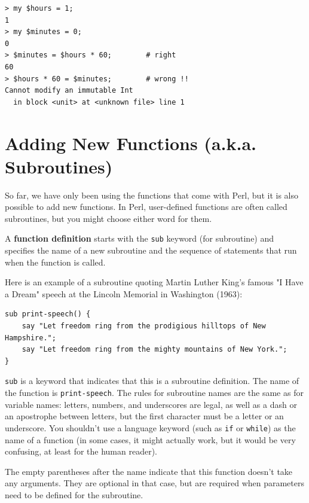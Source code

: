 \begin{verbatim}
> my $hours = 1;
1
> my $minutes = 0;
0
> $minutes = $hours * 60;        # right 
60
> $hours * 60 = $minutes;        # wrong !!
Cannot modify an immutable Int
  in block <unit> at <unknown file> line 1
\end{verbatim}
%


\section{Adding New Functions (a.k.a. Subroutines)}

So far, we have only been using the functions that come with Perl,
but it is also possible to add new functions. In Perl, 
user-defined functions are often called subroutines, but you might choose 
either word for them. 

A {\bf function definition} starts with the {\tt sub} keyword (for
subroutine) and specifies the name of a new subroutine and
the sequence of statements that run when the function is called.

Here is an example of a subroutine quoting Martin Luther King's 
famous "I Have a Dream" speech at the Lincoln Memorial in 
Washington (1963):

\begin{verbatim}
sub print-speech() {
    say "Let freedom ring from the prodigious hilltops of New Hampshire.";
    say "Let freedom ring from the mighty mountains of New York.";
}
\end{verbatim}
%
{\tt sub} is a keyword that indicates that this is a subroutine
definition.  The name of the function is \verb"print-speech".  The
rules for subroutine names are the same as for variable names: letters,
numbers, and underscores are legal, as well as a dash or an 
apostrophe between letters, but the first character
must be a letter or an underscore.  You shouldn't use a 
language keyword (such as {\tt if} or {\tt while}) as 
the name of a function (in some cases, it might actually work, 
but it would be very confusing, at least for the human reader).

The empty parentheses after the name indicate that this function
doesn't take any arguments. They are optional in that case, but are 
required when parameters need to be defined for the subroutine.

